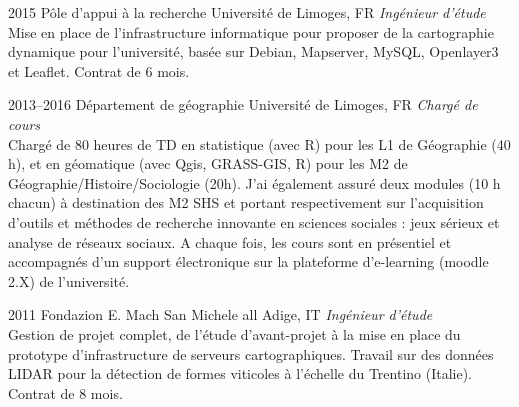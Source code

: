 \documentclass[]{cv-etienne}
\begin{document}
\begin{entrylist}
  \entry
  {2015}
  {Pôle d'appui à la recherche}
  {Université de Limoges, FR}
  {\emph{Ingénieur d'étude} \\
  Mise en place de l'infrastructure informatique pour proposer de la cartographie dynamique pour l'université, basée sur Debian, Mapserver, MySQL, Openlayer3 et Leaflet. Contrat de 6 mois.
  }
\end{entrylist}
\begin{entrylist}
  \entry
  {2013--2016}
  {Département de géographie}
  {Université de Limoges, FR}
  {\emph{Chargé de cours} \\
  Chargé de 80 heures de TD en statistique (avec R) pour les L1 de Géographie (40 h), et en géomatique (avec Qgis, GRASS-GIS, R) pour les M2 de Géographie/Histoire/Sociologie (20h). J'ai également assuré deux modules (10 h chacun) à destination des M2 SHS et portant respectivement sur l’acquisition d’outils et méthodes de recherche innovante en sciences sociales : jeux sérieux et analyse de réseaux sociaux. A chaque fois, les cours sont en présentiel et accompagnés d'un support électronique sur la plateforme d'e-learning (moodle 2.X) de l'université.
  }
\end{entrylist}
\begin{entrylist}
  \entry
  {2011}
  {Fondazion E. Mach}
  {San Michele all Adige, IT}
  {\emph{Ingénieur d'étude}\\
  Gestion de projet complet, de l'étude d'avant-projet à la mise en place du prototype d'infrastructure de serveurs cartographiques. Travail sur des données LIDAR pour la détection de formes viticoles à l'échelle du Trentino (Italie). Contrat de 8 mois.
  }
\end{entrylist}
\end{document}
